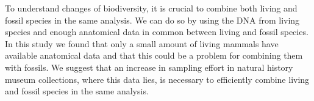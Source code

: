 \documentclass{article} %
\begin{document}

To understand changes of biodiversity, it is crucial to combine both living and fossil species in the same analysis.
We can do so by using the DNA from living species and enough anatomical data in common between living and fossil species.
In this study we found that only a small amount of living mammals have available anatomical data and that this could be a problem for combining them with fossils.
We suggest that an increase in sampling effort in natural history museum collections, where this data lies, is necessary to efficiently combine living and fossil species in the same analysis.
\end{document}
